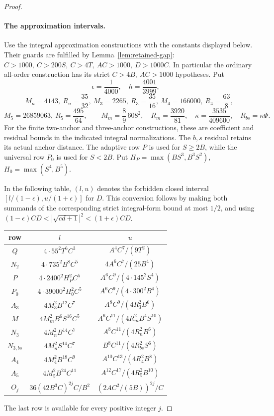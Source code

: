 \documentclass[12pt]{article}
\numberwithin{equation}{section}
\begin{document}
\begin{proof}
\paragraph{The approximation intervals.}
Use the integral approximation constructions with the constants displayed
below. Their guards are fulfilled by Lemma~\ref{lem:retained-gap}:
\(C>1000,\ C>200S,\ C>4T,\ AC>1000,\ D>1000C\).
In particular the ordinary all-order construction has its strict
\(C>4B,\ AC>1000\) hypotheses. Put
\[
 \epsilon=\frac1{4000},\quad h=\frac{4001}{3999},\quad
\]\[
 M_n=4143,\ R_n=\frac{35}{32},\
 M_3=2265,\ R_3=\frac{35}{16},\
 M_4=166000,\ R_4=\frac{63}{8},
\]
\[
 M_5=26859063,\ R_5=\frac{495}{64},\qquad
 M_m=\frac89\,608^2,\quad R_m=\frac{3920}{81},\quad
 \kappa=\frac{3535}{409600},\quad R_{bs}=\kappa\Phi.
\]
For the finite two-anchor and three-anchor constructions, these are
coefficient and residual bounds in the indicated integral normalizations.
The \(b,s\) residual retains its actual anchor distance. The adaptive
row \(P\) is used for \(S\ge2B\), while the universal row \(P_0\)
is used for \(S<2B\). Put
\(H_P=\max(BS^3,B^3S^2)\), \(H_0=\max(S^4,B^5)\).

In the following table, \((l,u)\) denotes the forbidden closed interval
\([l/(1-\epsilon),u/(1+\epsilon)]\) for \(D\). This conversion follows
by making both summands of the corresponding strict integral-form
bound at most \(1/2\), and using
\((1-\epsilon)CD<|\sqrt{cd+1}|^2<(1+\epsilon)CD\).
\begin{center}\small
\begin{tabular}{c|c|c}
row&\(l\)&\(u\)\\\hline
\(Q\)&\(4\cdot55^2T^6C^3\)&\(A^4C^7/(9T^2)\)\\
\(N_2\)&\(4\cdot735^2B^8C^5\)&\(4A^6C^7/(25B^4)\)\\
\(P\)&\(4\cdot2400^2H_P^2C^5\)&\(A^6C^9/(4\cdot145^2S^4)\)\\
\(P_0\)&\(4\cdot39000^2H_0^2C^5\)&\(A^6C^9/(4\cdot300^2B^4)\)\\
\(A_3\)&\(4M_3^2B^{12}C^7\)&\(A^8C^9/(4R_3^2B^6)\)\\
\(M\)&\(4M_m^2B^6S^{16}C^5\)&\(A^6C^{11}/(4R_m^2B^4S^{10})\)\\
\(N_3\)&\(4M_n^2B^{14}C^7\)&\(A^8C^{11}/(4R_n^2B^6)\)\\
\(N_{3,bs}\)&\(4M_n^2S^{14}C^7\)&\(B^8C^{11}/(4R_{bs}^2S^6)\)\\
\(A_4\)&\(4M_4^2B^{18}C^9\)&\(A^{10}C^{13}/(4R_4^2B^8)\)\\
\(A_5\)&\(4M_5^2B^{24}C^{11}\)&\(A^{12}C^{17}/(4R_5^2B^{10})\)\\
\(O_j\)&\(36(42B^3C)^{2j}C/B^2\)&\((2AC^2/(5B))^{2j}/C\)
\end{tabular}
\end{center}
The last row is available for every positive integer \(j\).


\end{proof}
\end{document}
